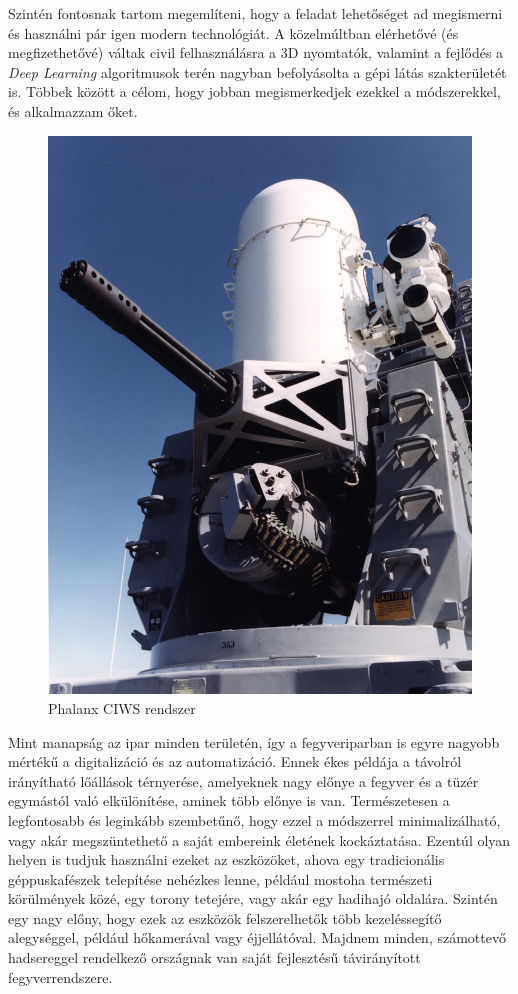 \documentclass[12pt,a4paper]{article}
\begin{document}
Szintén fontosnak tartom megemlíteni, hogy a feladat lehetőséget ad megismerni és használni pár igen modern technológiát. A közelmúltban elérhetővé (és megfizethetővé) váltak civil felhasználásra a 3D nyomtatók, valamint a fejlődés a \textsl{Deep Learning} algoritmusok terén nagyban befolyásolta a gépi látás szakterületét is. Többek között a célom, hogy jobban megismerkedjek ezekkel a módszerekkel, és alkalmazzam őket.\\

\begin{figure}
	\centering
	\includegraphics[width=.95\linewidth]{irod_phalanx} 
	\caption{Phalanx CIWS rendszer \cite{CIWS}}
	\label{fig:irod_phalanx}
\end{figure}

Mint manapság az ipar minden területén, így a fegyveriparban is egyre nagyobb mértékű a digitalizáció és az automatizáció. Ennek ékes példája a távolról irányítható lőállások térnyerése, amelyeknek nagy előnye a fegyver és a tüzér egymástól való elkülönítése, aminek több előnye is van. Természetesen a legfontosabb és leginkább szembetűnő, hogy ezzel a módszerrel minimalizálható, vagy akár megszüntethető a saját embereink életének kockáztatása. Ezentúl olyan helyen is tudjuk használni ezeket az eszközöket, ahova egy tradicionális géppuskafészek telepítése nehézkes lenne, például mostoha természeti körülmények közé, egy torony tetejére, vagy akár egy hadihajó oldalára. Szintén egy nagy előny, hogy ezek az eszközök felszerelhetők több kezeléssegítő alegységgel, például hőkamerával vagy éjjellátóval. Majdnem minden, számottevő hadsereggel rendelkező országnak van saját fejlesztésű távirányított fegyverrendszere.\\
\end{document}
